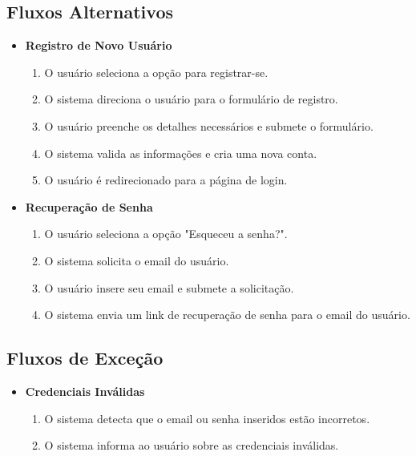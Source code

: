 \subsection*{Fluxos Alternativos}
\begin{addmargin}[1.5cm]{0cm}
	\begin{itemize}
		\item \textbf{Registro de Novo Usuário}
		      \begin{enumerate}
			      \item O usuário seleciona a opção para registrar-se.
			      \item O sistema direciona o usuário para o formulário de registro.
			      \item O usuário preenche os detalhes necessários e submete o formulário.
			      \item O sistema valida as informações e cria uma nova conta.
			      \item O usuário é redirecionado para a página de login.
		      \end{enumerate}

		\item \textbf{Recuperação de Senha}
		      \begin{enumerate}
			      \item O usuário seleciona a opção "Esqueceu a senha?".
			      \item O sistema solicita o email do usuário.
			      \item O usuário insere seu email e submete a solicitação.
			      \item O sistema envia um link de recuperação de senha para o email do usuário.
		      \end{enumerate}
	\end{itemize}
\end{addmargin}

\subsection*{Fluxos de Exceção}
\begin{addmargin}[1.5cm]{0cm}
	\begin{itemize}
		\item \textbf{Credenciais Inválidas}
		      \begin{enumerate}
			      \item O sistema detecta que o email ou senha inseridos estão incorretos.
			      \item O sistema informa ao usuário sobre as credenciais inválidas.
		      \end{enumerate}
	\end{itemize}
\end{addmargin}

